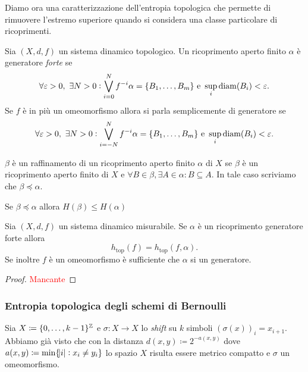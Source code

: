 Diamo ora una caratterizzazione dell'entropia topologica che permette di rimuovere l'estremo superiore quando si considera una classe particolare di ricoprimenti.

\begin{definition}[generatore]
    Sia $ (X, d, f) $ un sistema dinamico topologico. Un ricoprimento aperto finito $ \alpha $ è generatore \emph{forte} se
    \[
        \forall \varepsilon > 0, \ \exists N > 0 : \bigvee_{i=0}^{N}f^{-i}\alpha = \{B_1, \ldots, B_m\} \text{ e } \sup_{i} \mathrm{diam}{(B_i)} < \varepsilon.
    \]
    Se $ f $ è in più un omeomorfismo allora si parla semplicemente di generatore se
    \[
        \forall \varepsilon > 0, \ \exists N > 0 : \bigvee_{i=-N}^{N}f^{-i}\alpha = \{B_1, \ldots, B_m\} \text{ e } \sup_{i} \mathrm{diam}{(B_i)} < \varepsilon.
    \]
\end{definition}

\begin{definition}[raffinamento]
    $ \beta $ è un raffinamento di un ricoprimento aperto finito $ \alpha $ di $ X $ se $ \beta $ è un ricoprimento aperto finito di $ X $ e $ \forall B \in \beta, \exists A \in \alpha : B \subseteq A $. In tale caso scriviamo che $ \beta \preceq \alpha $.
\end{definition}

\begin{exercise}
    Se $ \beta \preceq \alpha $ allora $ H(\beta) \leq H(\alpha) $
\end{exercise}

\begin{thm} \label{thm:entropia-top-generatore}
    Sia $ (X, d, f) $ un sistema dinamico misurabile. Se $ \alpha $ è un ricoprimento generatore forte allora
    \[
        h_{\mathrm{top}}(f) = h_{\mathrm{top}}(f, \alpha).
    \]
    Se inoltre $ f $ è un omeomorfismo è sufficiente che $ \alpha $ si un generatore.
\end{thm}
\begin{proof}
    \textcolor{red}{Mancante}
\end{proof}

\subsubsection{Entropia topologica degli schemi di Bernoulli}
Sia $ X \coloneqq \{0, \ldots, k-1\}^{\mathbb{Z}} $ e $ \sigma \colon X \to X $ lo \emph{shift} su $ k $ simboli $ (\sigma(x))_i = x_{i+1} $. Abbiamo già visto che con la distanza $ d(x, y) \coloneqq 2^{-a(x, y)} $ dove $ a(x, y) \coloneqq \min\{\abs{i} : x_{i} \neq y_{i}\} $ lo spazio $ X $ risulta essere metrico compatto e $ \sigma $ un omeomorfismo.\\

